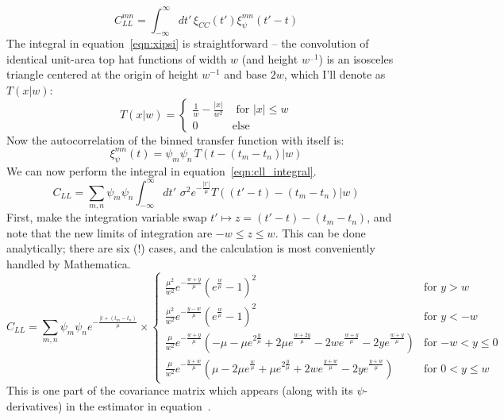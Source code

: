 \documentclass[11pt,a4paper]{article}
\begin{document}
\begin{equation}
C_{LL}^{mn}=\int_{-\infty}^{\infty}dt'\,\xi_{CC}(t')\xi_{\psi}^{mn}(t'-t)
\label{eqn:cll_integral}
\end{equation}
The integral in equation~\ref{eqn:xipsi} is straightforward -- the
convolution of identical unit-area top hat functions of width $w$ (and
height $w^{_-1}$) is an isosceles triangle centered at the origin of
height $w^{-1}$ and base $2w$, which I'll denote as $T(x|w)$:
\begin{equation}
T(x|w)= \begin{cases}
  \frac{1}{w}-\frac{|x|}{w^2} & \text{ for $|x| \le w $} \\
  0 & \text{else}
\end{cases}
\end{equation}
Now the autocorrelation of the binned transfer function with itself
is:
\begin{equation}
  \xi_{\psi}^{mn}(t)= \psi_m\psi_n\,T(t-(t_m-t_n)|w)
\end{equation}
We can now perform the integral in equation~\ref{eqn:cll_integral}.
\begin{equation}
C_{LL} = \sum\limits_{m,n}\psi_m\psi_n\int_{-\infty}^{\infty}dt'\,\,\sigma^2e^{-\frac{|t'|}{\mu}}T((t'-t)-(t_m-t_n)|w)
\end{equation}
First, make the integration variable swap $t'\mapsto z =
(t'-t)-(t_m-t_n)$, and note that the new limits of integration are $-w
\le z \le w$. This can be done analytically; there are six (!) cases,
and the calculation is most conveniently handled by Mathematica.
\begin{equation}
  C_{LL}=
  \sum\limits_{m,n}\psi_m\psi_ne^{-\frac{|t+(t_m-t_n)}{\mu}}\times  
  \begin{cases}
    \frac{\mu^2}{w^2}e^{-\frac{w+y}{\mu}}\left(e^{\frac{w}{\mu}}-1\right)^2
    & \text{for $y > w$} \\
    \frac{\mu^2}{w^2}e^{-\frac{y-w}{\mu}}\left(e^{\frac{w}{\mu}}-1\right)^2
    & \text{for $y < -w$} \\
    \frac{\mu}{w^2}e^{-\frac{w+y}{\mu}}\left(-\mu -
      \mu e^{2\frac{y}{\mu}}+2\mu e^{\frac{w+2y}{\mu}}-2w
      e^{\frac{w+y}{\mu}} - 2ye^{\frac{w+y}{\mu}}\right) & \text{for
      $-w < y \leq 0$} \\
    \frac{\mu}{w^2}e^{-\frac{y+w}{\mu}}\left( \mu - 2\mu
      e^{\frac{w}{\mu}} +\mu e^{2\frac{y}{\mu}} + 2w
      e^{\frac{y+w}{\mu}} - 2y e^{\frac{y+w}{\mu}} \right) & \text{for
      $0 < y \leq w$}
  \end{cases}
\end{equation}
This is one part of the covariance matrix which appears (along with
its $\psi$-derivatives) in the estimator in
equation~\label{eqn:estimator}.
\end{document}
